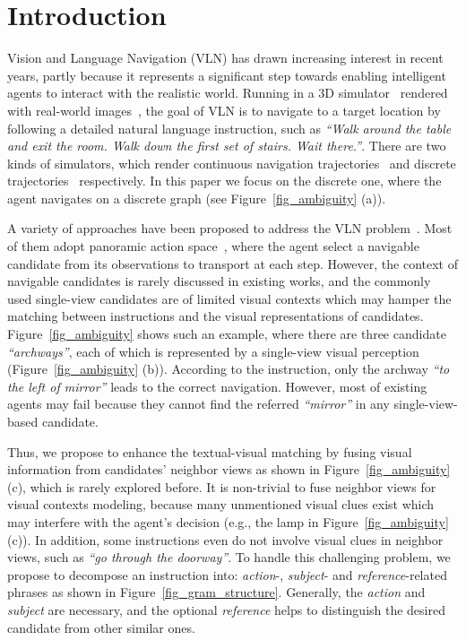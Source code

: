 \documentclass[sigconf]{acmart}
\begin{document}
\section{Introduction}\label{sec_introduction}
Vision and Language Navigation (VLN) has drawn increasing interest in recent years, partly because it represents a significant step towards enabling intelligent agents to interact with the realistic world. 
Running in a 3D simulator~\cite{anderson2018vln} rendered with real-world images~\cite{angle2017matterport}, the goal of VLN is to navigate to a target location by following a detailed natural language instruction, such as \textit{``Walk around the table and exit the room. Walk down the first set of stairs. Wait there.''}. There are two kinds of simulators, which render continuous navigation trajectories~\cite{jacob2020vlnce} and discrete trajectories~\cite{anderson2018vln} respectively. In this paper we focus on the discrete one, where the agent navigates on a discrete graph (see Figure~\ref{fig_ambiguity} (a)).



A variety of approaches have been proposed to address the VLN problem~\cite{wang2018leap,fried2018speaker,landi2019dynamic,tan2019envdrop,ma2019self-monitoring,wang2019rcm,li2019press,qi2020oaam,hao2020prevelant,arjun2020vln-bert,wang2020multitask,wang2020SERL,hong2020relgraph,deng2020EGP,hong2020vln-bert}. Most of them adopt panoramic action space~\cite{fried2018speaker}, where the agent select a navigable candidate from its observations to transport at each step.
However, the context of navigable candidates is rarely discussed in existing works, and the commonly used single-view candidates are of limited visual contexts which may hamper the matching between instructions and the visual representations of candidates.
Figure~\ref{fig_ambiguity} shows such an example, where there are three candidate \textit{``archways''}, each of which is represented by a single-view visual perception (Figure~\ref{fig_ambiguity} (b)). 
According to the instruction, only the archway \textit{``to the left of mirror''} leads to the correct navigation. 
However, most of existing agents may fail because they cannot find the referred \textit{``mirror''} in any single-view-based candidate. 



Thus, we propose to enhance the textual-visual matching by fusing visual information from candidates' neighbor views as shown in Figure~\ref{fig_ambiguity} (c), which is rarely explored before.
It is non-trivial to fuse neighbor views for visual contexts modeling, because many unmentioned visual clues exist which may interfere with the agent's decision (e.g., the lamp in Figure~\ref{fig_ambiguity} (c)). 
In addition, some instructions even do not involve visual clues in neighbor views, such as \textit{``go through the doorway''}. 
To handle this challenging problem, we propose to decompose an instruction into: \textit{action}-, \textit{subject}- and \textit{reference}-related phrases as shown in Figure~\ref{fig_gram_structure}.
Generally, the \textit{action} and \textit{subject} are necessary, and the optional \textit{reference} helps to distinguish the desired candidate from other similar ones. 
\end{document}
